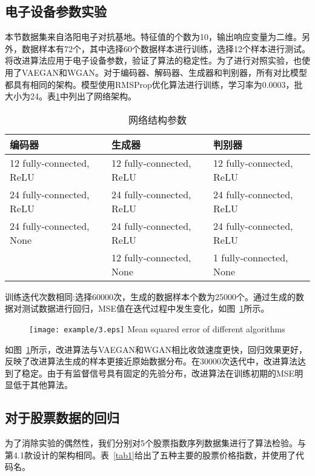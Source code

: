\subsection{电子设备参数实验}

本节数据集来自洛阳电子对抗基地。特征值的个数为10，输出响应变量为二维。另外，数据样本有72个，其中选择60个数据样本进行训练，选择12个样本进行测试。将改进算法应用于电子设备参数，验证了算法的稳定性。为了进行对照实验，也使用了VAEGAN和WGAN。对于编码器、解码器、生成器和判别器，所有对比模型都具有相同的架构。模型使用RMSProp优化算法进行训练，学习率为0.0003，批大小为24。表\ref{tab3}中列出了网络架构。

\begin{table}[!hpb]
	\centering
	\caption{网络结构参数}
	\label{tab3}
	\begin{tabular}{lll} \toprule
		编码器   & 生成器 & 判别器  \\  \midrule
		12 fully-connected, ReLU &12 fully-connected, ReLU&12 fully-connected, ReLU\\
		24 fully-connected, ReLU&24 fully-connected, ReLU&24 fully-connected, ReLU\\
		24 fully-connected, None&24 fully-connected, ReLU&24 fully-connected, ReLU\\
		&12 fully-connected, None&1 fully-connected, None\\ \bottomrule
	\end{tabular}
\end{table}

训练迭代次数相同:选择60000次，生成的数据样本个数为25000个。通过生成的数据对测试数据进行回归，MSE值在迭代过程中发生变化，如图~\ref{fig3}所示。

\begin{figure}[htpb]
	\centering
	\texttt{[image: example/3.eps]}
	{Mean squared error of different algorithms}
	\label{fig3}
\end{figure}

如图~\ref{fig3}所示，改进算法与VAEGAN和WGAN相比收敛速度更快，回归效果更好，反映了改进算法生成的样本更接近原始数据分布。在30000次迭代中，改进算法达到了稳定。由于有监督信号具有固定的先验分布，改进算法在训练初期的MSE明显低于其他算法。

\subsection{对于股票数据的回归}

为了消除实验的偶然性，我们分别对5个股票指数序列数据集进行了算法检验。与第4.1款设计的架构相同。表~\ref{tab1}给出了五种主要的股票价格指数，并使用了代码名。

